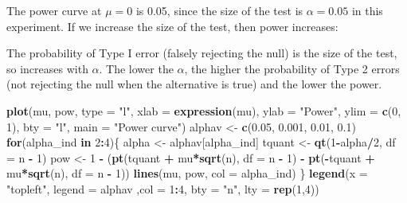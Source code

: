 \documentclass[]{book}
\newenvironment{Shaded}{\begin{snugshade}}{\end{snugshade}}
\newcommand{\ControlFlowTok}[1]{\textcolor[rgb]{0.13,0.29,0.53}{\textbf{#1}}}
\newcommand{\DataTypeTok}[1]{\textcolor[rgb]{0.13,0.29,0.53}{#1}}
\newcommand{\DecValTok}[1]{\textcolor[rgb]{0.00,0.00,0.81}{#1}}
\newcommand{\FloatTok}[1]{\textcolor[rgb]{0.00,0.00,0.81}{#1}}
\newcommand{\KeywordTok}[1]{\textcolor[rgb]{0.13,0.29,0.53}{\textbf{#1}}}
\newcommand{\NormalTok}[1]{#1}
\newcommand{\OperatorTok}[1]{\textcolor[rgb]{0.81,0.36,0.00}{\textbf{#1}}}
\newcommand{\StringTok}[1]{\textcolor[rgb]{0.31,0.60,0.02}{#1}}
\theoremstyle{definition}
\theoremstyle{definition}
\theoremstyle{definition}
\theoremstyle{remark}
\begin{document}
The power curve at \(\mu=0\) is 0.05, since the size of the test is \(\alpha= 0.05\) in this experiment. If we increase the size of the test, then power increases:

The probability of Type I error (falsely rejecting the null) is the size of the test, so increases with \(\alpha\). The lower the \(\alpha\), the higher the probability of Type 2 errors (not rejecting the null when the alternative is true) and the lower the power.

\begin{Shaded}
\begin{Highlighting}[]
\KeywordTok{plot}\NormalTok{(mu, pow,}
     \DataTypeTok{type =} \StringTok{"l"}\NormalTok{, }\DataTypeTok{xlab =} \KeywordTok{expression}\NormalTok{(mu), }
     \DataTypeTok{ylab =} \StringTok{"Power"}\NormalTok{, }
     \DataTypeTok{ylim =} \KeywordTok{c}\NormalTok{(}\DecValTok{0}\NormalTok{, }\DecValTok{1}\NormalTok{), }\DataTypeTok{bty =} \StringTok{"l"}\NormalTok{,}
     \DataTypeTok{main =} \StringTok{"Power curve"}\NormalTok{)}
\NormalTok{ alphav <-}\StringTok{ }\KeywordTok{c}\NormalTok{(}\FloatTok{0.05}\NormalTok{, }\FloatTok{0.001}\NormalTok{, }\FloatTok{0.01}\NormalTok{, }\FloatTok{0.1}\NormalTok{)}
\ControlFlowTok{for}\NormalTok{(alpha_ind }\ControlFlowTok{in} \DecValTok{2}\OperatorTok{:}\DecValTok{4}\NormalTok{)\{}
\NormalTok{  alpha <-}\StringTok{ }\NormalTok{alphav[alpha_ind]}
\NormalTok{  tquant <-}\StringTok{ }\KeywordTok{qt}\NormalTok{(}\DecValTok{1}\OperatorTok{-}\NormalTok{alpha}\OperatorTok{/}\DecValTok{2}\NormalTok{, }\DataTypeTok{df =}\NormalTok{ n }\OperatorTok{-}\StringTok{ }\DecValTok{1}\NormalTok{)}
\NormalTok{  pow <-}\StringTok{ }\DecValTok{1} \OperatorTok{-}\StringTok{ }\NormalTok{(}\KeywordTok{pt}\NormalTok{(tquant }\OperatorTok{+}\StringTok{ }\NormalTok{mu}\OperatorTok{*}\KeywordTok{sqrt}\NormalTok{(n), }\DataTypeTok{df =}\NormalTok{ n }\OperatorTok{-}\StringTok{ }\DecValTok{1}\NormalTok{) }\OperatorTok{-}\StringTok{ }
\StringTok{                   }\KeywordTok{pt}\NormalTok{(}\OperatorTok{-}\NormalTok{tquant }\OperatorTok{+}\StringTok{ }\NormalTok{mu}\OperatorTok{*}\KeywordTok{sqrt}\NormalTok{(n), }\DataTypeTok{df =}\NormalTok{ n }\OperatorTok{-}\StringTok{ }\DecValTok{1}\NormalTok{))}
\KeywordTok{lines}\NormalTok{(mu, pow, }\DataTypeTok{col =}\NormalTok{ alpha_ind)}
\NormalTok{\}}
\KeywordTok{legend}\NormalTok{(}\DataTypeTok{x =} \StringTok{"topleft"}\NormalTok{, }\DataTypeTok{legend =}\NormalTok{ alphav ,}\DataTypeTok{col =} \DecValTok{1}\OperatorTok{:}\DecValTok{4}\NormalTok{, }\DataTypeTok{bty =} \StringTok{"n"}\NormalTok{, }\DataTypeTok{lty =} \KeywordTok{rep}\NormalTok{(}\DecValTok{1}\NormalTok{,}\DecValTok{4}\NormalTok{))}
\end{Highlighting}
\end{Shaded}
\end{document}

